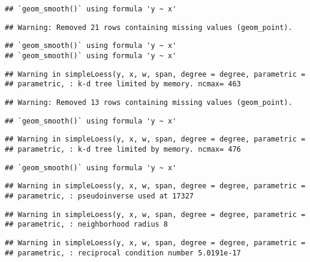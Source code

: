 \documentclass[
]{article}
\begin{document}
\begin{verbatim}
## `geom_smooth()` using formula 'y ~ x'
\end{verbatim}

\begin{verbatim}
## Warning: Removed 21 rows containing missing values (geom_point).
\end{verbatim}

\begin{verbatim}
## `geom_smooth()` using formula 'y ~ x'
## `geom_smooth()` using formula 'y ~ x'
\end{verbatim}

\begin{verbatim}
## Warning in simpleLoess(y, x, w, span, degree = degree, parametric =
## parametric, : k-d tree limited by memory. ncmax= 463
\end{verbatim}

\begin{verbatim}
## Warning: Removed 13 rows containing missing values (geom_point).
\end{verbatim}

\begin{verbatim}
## `geom_smooth()` using formula 'y ~ x'
\end{verbatim}

\begin{verbatim}
## Warning in simpleLoess(y, x, w, span, degree = degree, parametric =
## parametric, : k-d tree limited by memory. ncmax= 476
\end{verbatim}

\begin{verbatim}
## `geom_smooth()` using formula 'y ~ x'
\end{verbatim}

\begin{verbatim}
## Warning in simpleLoess(y, x, w, span, degree = degree, parametric =
## parametric, : pseudoinverse used at 17327
\end{verbatim}

\begin{verbatim}
## Warning in simpleLoess(y, x, w, span, degree = degree, parametric =
## parametric, : neighborhood radius 8
\end{verbatim}

\begin{verbatim}
## Warning in simpleLoess(y, x, w, span, degree = degree, parametric =
## parametric, : reciprocal condition number 5.0191e-17
\end{verbatim}
\end{document}

